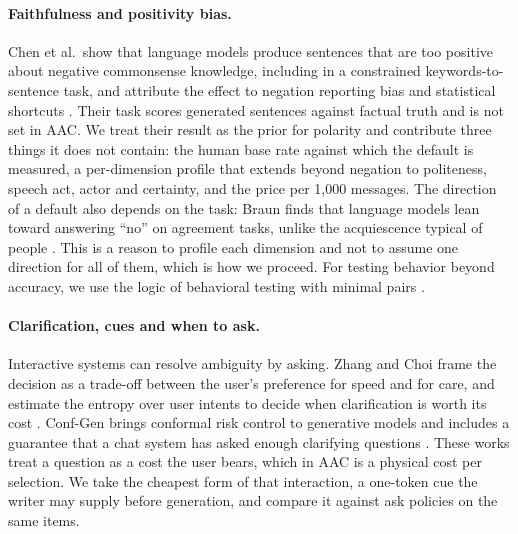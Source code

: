 \paragraph{Faithfulness and positivity bias.}
Chen et al.\ show that language models produce sentences that are too positive about negative commonsense knowledge, including in a constrained keywords-to-sentence task, and attribute the effect to negation reporting bias and statistical shortcuts \cite{chen2023say}. Their task scores generated sentences against factual truth and is not set in AAC. We treat their result as the prior for polarity and contribute three things it does not contain: the human base rate against which the default is measured, a per-dimension profile that extends beyond negation to politeness, speech act, actor and certainty, and the price per 1,000 messages. The direction of a default also depends on the task: Braun finds that language models lean toward answering ``no'' on agreement tasks, unlike the acquiescence typical of people \cite{braun2025acquiescence}. This is a reason to profile each dimension and not to assume one direction for all of them, which is how we proceed. For testing behavior beyond accuracy, we use the logic of behavioral testing with minimal pairs \cite{ribeiro2020checklist}.

\paragraph{Clarification, cues and when to ask.}
Interactive systems can resolve ambiguity by asking. Zhang and Choi frame the decision as a trade-off between the user's preference for speed and for care, and estimate the entropy over user intents to decide when clarification is worth its cost \cite{zhang2025clarify}. Conf-Gen brings conformal risk control to generative models and includes a guarantee that a chat system has asked enough clarifying questions \cite{loaizaganem2026confgen}. These works treat a question as a cost the user bears, which in AAC is a physical cost per selection. We take the cheapest form of that interaction, a one-token cue the writer may supply before generation, and compare it against ask policies on the same items. %

